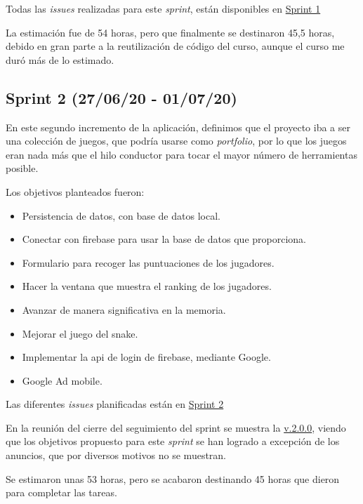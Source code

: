 Todas las \emph{issues} realizadas para este \emph{sprint}, están disponibles en \href{https://github.com/scc0034/flutter_serpiente/milestone/1?closed=1}{Sprint 1}

La estimación fue de 54 horas, pero que finalmente se destinaron 45,5 horas, debido en gran parte a la reutilización de código del curso, aunque el curso me duró más de lo estimado.


\subsection{Sprint 2 (27/06/20 - 01/07/20)}\label{sprint-1-270620---010720}
En este segundo incremento de la aplicación, definimos que el proyecto iba a ser una colección de juegos, que podría usarse como \emph{portfolio}, por lo que los juegos eran nada más que el hilo conductor para tocar el mayor número de herramientas posible. 

Los objetivos planteados fueron:
\begin{itemize}
	\item Persistencia de datos, con base de datos local.
	\item Conectar con firebase para usar la base de datos que proporciona.
	\item Formulario para recoger las puntuaciones de los jugadores.
	\item Hacer la ventana que muestra el ranking de los jugadores.
	\item Avanzar de manera significativa en la memoria.
	\item Mejorar el juego del snake.
	\item Implementar la api de login de firebase, mediante Google.
	\item Google Ad mobile.
\end{itemize}

Las diferentes \emph{issues} planificadas están en \href{https://github.com/scc0034/flutter_serpiente/milestone/2?closed=1}{Sprint 2}


En la reunión del cierre del seguimiento del sprint se muestra la \href{https://github.com/scc0034/flutter_serpiente/releases/tag/V.2.0.0/}{v.2.0.0}, viendo que los objetivos propuesto para este \emph{sprint} se han logrado a excepción de los anuncios, que por diversos motivos no se muestran.
 	
Se estimaron unas 53 horas, pero se acabaron destinando 45 horas que dieron para completar las tareas.


